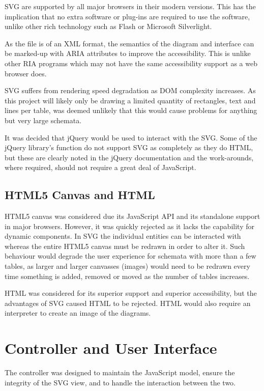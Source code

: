 SVG are supported by all major browsers in their modern versions. This has the implication that no extra software or plug-ins are required to use the software, unlike other rich technology such as Flash or Micro\-soft Silver\-light.

As the file is of an XML format, the semantics of the diagram and interface can be marked-up with ARIA attributes to improve the accessibility. This is unlike other RIA programs which may not have the same accessibility support as a web browser does.

SVG suffers from rendering speed degradation as DOM complexity increases. As this project will likely only be drawing a limited quantity of rectangles, text and lines per table, was deemed unlikely that this would cause problems for anything but very large schemata.

It was decided that jQuery would be used to interact with the SVG. Some of the jQuery library's function do not support SVG as completely as they do HTML, but these are clearly noted in the jQuery documentation and the work-arounds, where required, should not require a great deal of Java\-Script.

\subsection{HTML5 Canvas and HTML}
HTML5 canvas was considered due its Java\-Script API and its standalone support in major browsers. However, it was quickly rejected as it lacks the capability for dynamic components. In SVG the individual entities can be interacted with whereas the entire HTML5 canvas must be redrawn in order to alter it. Such behaviour would degrade the user experience for schemata with more than a few tables, as larger and larger canvasses (images) would need to be redrawn every time something is added, removed or moved as the number of tables increases.

HTML was considered for its superior support and superior accessibility, but the advantages of SVG caused HTML to be rejected. HTML would also require an interpreter to create an image of the diagrams.

\section{Controller and User Interface}
The controller was designed to maintain the Java\-Script model, ensure the integrity of the SVG view, and to handle the interaction between the two.

